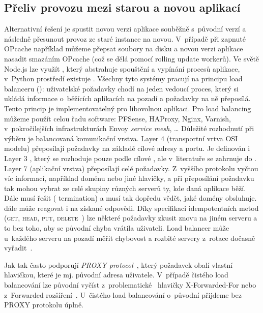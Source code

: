         \subsection{Přeliv provozu mezi starou a novou aplikací}
            \label{deploy-v-jedne-instanci}
            Alternativní řešení je spustit novou verzi aplikace souběžně s~původní verzí a následně přesunout provoz ze staré instance na novou. V~případě  při zapnuté OPcache například můžeme přepsat soubory na disku a novou verzi aplikace nasadit smazáním OPcache (což se dělá pomocí rolling update  workerů). Ve světě Node.js lze využít , který abstrahuje spouštění a vypínání procesů aplikace, v~Python prostředí existuje . Všechny tyto systémy pracují na principu load balanceru (): uživatelské požadavky chodí na jeden vedoucí proces, který si ukládá informace o~běžících aplikacích na pozadí a požadavky na ně přeposílá. Tento princip je implementovatelný pro libovolnou aplikaci. Pro load balancing můžeme použít celou řadu software: PFSense, HAProxy, Nginx, Varnish, v~pokročilejších infrastrukturách Envoy \textit{service mesh}, … Důležité rozhodnutí při výběru  je balancovaná komunikační vrstva. Layer 4 (transportní vrtva OSI modelu)  přeposílají  požadavky na základě cílové  adresy a portu. Je definován i Layer 3 , který se rozhoduje pouze podle cílové , ale v~literatuře se zahrnuje do . Layer 7 (aplikační vrstva)  přeposílají celé \HTTP požadavky. Z~vyššího protokolu vyčtou víc informací, například doménu nebo jiné hlavičky, a při přeposílání požadavku tak mohou vybrat ze celé skupiny různých serverů ty, kde daná aplikace běží. Dále   musí řešit  ( termination) a musí tak dopředu vědět, jaké domény obsluhuje.   dále může reagovat i na získané \HTTP odpovědi. Díky \HTTP specifikaci idempotentních metod (\textsc{get}, \textsc{head}, \textsc{put}, \textsc{delete}~\cite{http-idempotent}) lze některé požadavky zkusit znovu na jiném serveru a to bez toho, aby se původní chyba vrátila uživateli. Load balancer může u~každého serveru na pozadí měřit chybovost a rozbité servery z~rotace dočasně vyřadit~\cite{nginx-circuit-breaker}.

            Jak  tak   často podporují \textit{PROXY protocol}~\cite{tarreau-proxyprotocol}, který požadavek obalí vlastní hlavičkou, které je mj. původní  adresa uživatele. V~případě čistého  load balancování lze původní  vyčíst z~problematické~\cite{hansen-xforwardedfor} hlavičky X-Forwarded-For nebo z~Forwarded rozšíření~\cite{http-forwarded}. U~čistého  load balancování o~původní  přijdeme bez PROXY protokolu úplně.

